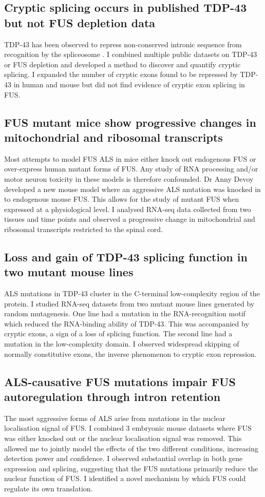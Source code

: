 \subsection{Cryptic splicing occurs in published TDP-43 but not FUS depletion data}
TDP-43 has been observed to repress non-conserved intronic sequence from recognition by the spliceosome \citep{Ling2015}. 
I combined multiple public datasets on TDP-43 or FUS depletion and developed a method to discover and quantify cryptic splicing.
I expanded the number of cryptic exons found to be repressed by TDP-43 in human and mouse but did not find evidence of cryptic exon splicing in FUS.

\subsection{FUS mutant mice show progressive changes in mitochondrial and ribosomal transcripts}
Most attempts to model FUS ALS in mice either knock out endogenous FUS or over-express human mutant forms of FUS. 
Any study of RNA processing and/or motor neuron toxicity in these models is therefore confounded.
Dr Anny Devoy developed a new mouse model where an aggressive ALS mutation was knocked in to endogenous mouse FUS. 
This allows for the study of mutant FUS when expressed at a physiological level. 
I analysed RNA-seq data collected from two tissues and time points and observed a progressive change in mitochondrial and ribosomal transcripts restricted to the spinal cord.

\subsection{Loss and gain of TDP-43 splicing function in two mutant mouse lines}
ALS mutations in TDP-43 cluster in the C-terminal low-complexity region of the protein.
I studied RNA-seq datasets from two mutant mouse lines generated by random mutagenesis. 
One line had a mutation in the RNA-recognition motif which reduced the RNA-binding ability of TDP-43.
This was accompanied by cryptic exons, a sign of a loss of splicing function.
The second line had a mutation in the low-complexity domain.
I observed widespread skipping of normally constitutive exons, the inverse phenomenon to cryptic exon repression.

\subsection{ALS-causative FUS mutations impair FUS autoregulation through intron retention}
The most aggressive forms of ALS arise from mutations in the nuclear localisation signal of FUS.
I combined 3 embryonic mouse datasets where FUS was either knocked out or the nuclear localisation signal was removed.
This allowed me to jointly model the effects of the two different conditions, increasing detection power and confidence.
I observed substantial overlap in both gene expression and splicing, suggesting that the FUS mutations primarily reduce the nuclear function of FUS.
I identified a novel mechanism by which FUS could regulate its own translation.



